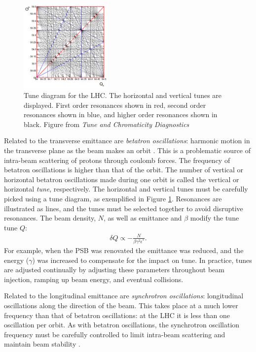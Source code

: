 \begin{figure}[h!]
\captionsetup[subfigure]{position=b}
\centering
\includegraphics[width=0.4\textwidth]{figures/experiment/tune.png}
\caption{Tune diagram for the LHC. The horizontal and vertical tunes are displayed. First order resonances shown in red, second order resonances shown in blue, and higher order resonances shown in black. Figure from \emph{Tune and Chromaticity Diagnostics} \cite{steinhagen}}
\label{fig:tune}
\end{figure}

Related to the transverse emittance are \emph{betatron oscillations}: harmonic motion in the transverse plane as the beam makes an orbit \cite{pdg2016}.
This is a problematic source of intra-beam scattering of protons through coulomb forces.
The frequency of betatron oscillations is higher than that of the orbit.
The number of vertical or horizontal betatron oscillations made during one orbit is called the vertical or horizontal \emph{tune}, respectively.
The horizontal and vertical tunes must be carefully picked using a tune diagram, as exemplified in Figure \ref{fig:tune}.
Resonances are illustrated as lines, and the tunes must be selected together to avoid disruptive resonances.
The beam density, $N$, as well as emittance and $\beta$ modify the tune tune $Q$:
\begin{equation}\begin{split}
    \delta Q\propto-\frac{N}{\beta\gamma^2\epsilon^*}.
\end{split}\end{equation} 
For example, when the PSB was renovated the emittance was reduced, and the energy ($\gamma$) was increased to compensate for the impact on tune.
In practice, tunes are adjusted continually by adjusting these parameters throughout beam injection, ramping up beam energy, and eventual collisions.

Related to the longitudinal emittance are \emph{synchrotron oscillations}: longitudinal oscillations along the direction of the beam.
This takes place at a much lower frequency than that of betatron oscillations: at the LHC it is less than one oscillation per orbit.
As with betatron oscillations, the synchrotron oscillation frequency must be carefully controlled to limit intra-beam scattering and maintain beam stability \cite{pdg2016}.

